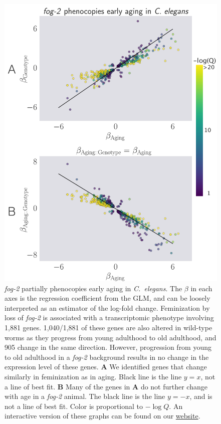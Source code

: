 \documentclass[10pt,letterpaper,twocolumn]{article}
\newcommand{\cel}{\emph{C.~elegans}}
\newcommand{\fog}{\emph{\mbox{fog-2}}}
\newcommand{\fogn}{1,881}
\newcommand{\coexpressed}{905}
\newcommand{\intersectn}{1,040}
\newcommand{\webref}{
\href{https://wormlabcaltech.github.io/Angeles_Leighton_2016/}{website}}
\begin{document}
\begin{figure}
\renewcommand{\familydefault}{\sfdefault}\normalfont{}
\centering
\includegraphics[width=\linewidth]{../output/figs/final_figs/aberrant_aging.pdf}
\caption{
\fog{} partially phenocopies early aging in \cel{}. The $\beta$ in
each axes is the regression coefficient from the GLM, and can be loosely
interpreted as an estimator of the log-fold change.
Feminization by loss of \fog{} is associated with a transcriptomic phenotype
involving \fogn{} genes. \intersectn{}/\fogn{} of these genes are also altered
in wild-type worms as they progress from young adulthood to old adulthood, and
\coexpressed{} change in the same direction. However, progression from young to
old adulthood in a \fog{} background results in no change in the expression
level of these genes. \textbf{A} We identified genes that change similarly in
feminization as in aging. Black line is the line $y=x$, not a line of best fit.
\textbf{B} Many of the genes in \textbf{A} do not further change with age in a
\fog{} animal.
The black line is the line $y=-x$, and is not a line of best fit. Color is
proportional to $-\log{Q}$.
An interactive version of these graphs can be found on our \webref{}.
}%
\label{fig:aberrant_aging}
\end{figure}
\end{document}
